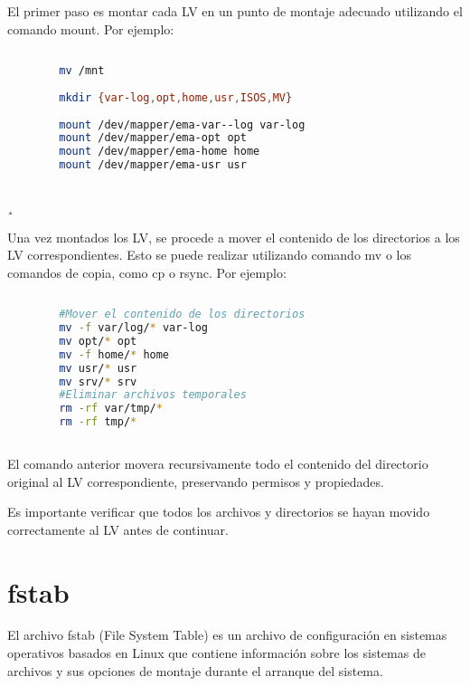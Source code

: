 		El primer paso es montar cada LV en un punto de montaje adecuado utilizando el comando mount. Por ejemplo:\par 
		
				
	\begin{lstlisting}[language=Bash, caption=Crear directorios y montar los (LVs)]
		
		mv /mnt
		
		mkdir {var-log,opt,home,usr,ISOS,MV}
		
		mount /dev/mapper/ema-var--log var-log
		mount /dev/mapper/ema-opt opt
		mount /dev/mapper/ema-home home
		mount /dev/mapper/ema-usr usr
		
	\end{lstlisting}
	¸
	
		Una vez montados los LV, se procede a mover el contenido de los directorios a los LV correspondientes. Esto se puede realizar utilizando comando mv o los comandos de copia, como cp o rsync. Por ejemplo:\par
		
	\begin{lstlisting}[language=Bash, caption=Mover directorios]
		
		#Mover el contenido de los directorios
		mv -f var/log/* var-log
		mv opt/* opt
		mv -f home/* home
		mv usr/* usr
		mv srv/* srv
		#Eliminar archivos temporales
		rm -rf var/tmp/*
		rm -rf tmp/*
		
	\end{lstlisting}
		
		El comando anterior movera recursivamente todo el contenido del directorio original al LV correspondiente, preservando permisos y propiedades.\par
		
		Es importante verificar que todos los archivos y directorios se hayan movido correctamente al LV antes de continuar.\par
	

		\vspace{0.3cm}
		
		\section{fstab}
						
			El archivo fstab (File System Table) es un archivo de configuración en sistemas operativos basados en Linux que contiene información sobre los sistemas de archivos y sus opciones de montaje durante el arranque del sistema.\par
			
